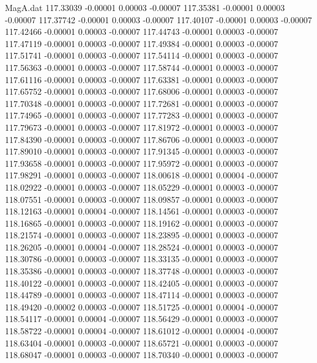 \begin{filecontents}{MagA.dat}
 117.33039   -0.00001    0.00003   -0.00007
 117.35381   -0.00001    0.00003   -0.00007
 117.37742   -0.00001    0.00003   -0.00007
 117.40107   -0.00001    0.00003   -0.00007
 117.42466   -0.00001    0.00003   -0.00007
 117.44743   -0.00001    0.00003   -0.00007
 117.47119   -0.00001    0.00003   -0.00007
 117.49384   -0.00001    0.00003   -0.00007
 117.51741   -0.00001    0.00003   -0.00007
 117.54114   -0.00001    0.00003   -0.00007
 117.56363   -0.00001    0.00003   -0.00007
 117.58744   -0.00001    0.00003   -0.00007
 117.61116   -0.00001    0.00003   -0.00007
 117.63381   -0.00001    0.00003   -0.00007
 117.65752   -0.00001    0.00003   -0.00007
 117.68006   -0.00001    0.00003   -0.00007
 117.70348   -0.00001    0.00003   -0.00007
 117.72681   -0.00001    0.00003   -0.00007
 117.74965   -0.00001    0.00003   -0.00007
 117.77283   -0.00001    0.00003   -0.00007
 117.79673   -0.00001    0.00003   -0.00007
 117.81972   -0.00001    0.00003   -0.00007
 117.84390   -0.00001    0.00003   -0.00007
 117.86706   -0.00001    0.00003   -0.00007
 117.89010   -0.00001    0.00003   -0.00007
 117.91345   -0.00001    0.00003   -0.00007
 117.93658   -0.00001    0.00003   -0.00007
 117.95972   -0.00001    0.00003   -0.00007
 117.98291   -0.00001    0.00003   -0.00007
 118.00618   -0.00001    0.00004   -0.00007
 118.02922   -0.00001    0.00003   -0.00007
 118.05229   -0.00001    0.00003   -0.00007
 118.07551   -0.00001    0.00003   -0.00007
 118.09857   -0.00001    0.00003   -0.00007
 118.12163   -0.00001    0.00004   -0.00007
 118.14561   -0.00001    0.00003   -0.00007
 118.16865   -0.00001    0.00003   -0.00007
 118.19162   -0.00001    0.00003   -0.00007
 118.21574   -0.00001    0.00003   -0.00007
 118.23895   -0.00001    0.00003   -0.00007
 118.26205   -0.00001    0.00004   -0.00007
 118.28524   -0.00001    0.00003   -0.00007
 118.30786   -0.00001    0.00003   -0.00007
 118.33135   -0.00001    0.00003   -0.00007
 118.35386   -0.00001    0.00003   -0.00007
 118.37748   -0.00001    0.00003   -0.00007
 118.40122   -0.00001    0.00003   -0.00007
 118.42405   -0.00001    0.00003   -0.00007
 118.44789   -0.00001    0.00003   -0.00007
 118.47114   -0.00001    0.00003   -0.00007
 118.49420   -0.00002    0.00003   -0.00007
 118.51725   -0.00001    0.00004   -0.00007
 118.54117   -0.00001    0.00004   -0.00007
 118.56429   -0.00001    0.00003   -0.00007
 118.58722   -0.00001    0.00004   -0.00007
 118.61012   -0.00001    0.00004   -0.00007
 118.63404   -0.00001    0.00003   -0.00007
 118.65721   -0.00001    0.00003   -0.00007
 118.68047   -0.00001    0.00003   -0.00007
 118.70340   -0.00001    0.00003   -0.00007

\end{filecontents}
